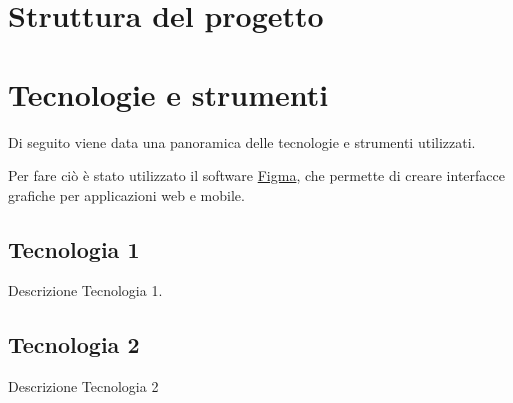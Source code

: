 \section{Struttura del progetto}
\label{sec:struttura-progetto}




\section{Tecnologie e strumenti}
\label{sec:tecnologie-strumenti}
Di seguito viene data una panoramica delle tecnologie e strumenti utilizzati.

Per fare ciò è stato utilizzato il software \href{https://www.figma.com/}{Figma}, che permette di creare interfacce grafiche per applicazioni web e mobile.\\

\subsection*{Tecnologia 1}
Descrizione Tecnologia 1.

\subsection*{Tecnologia 2}
Descrizione Tecnologia 2